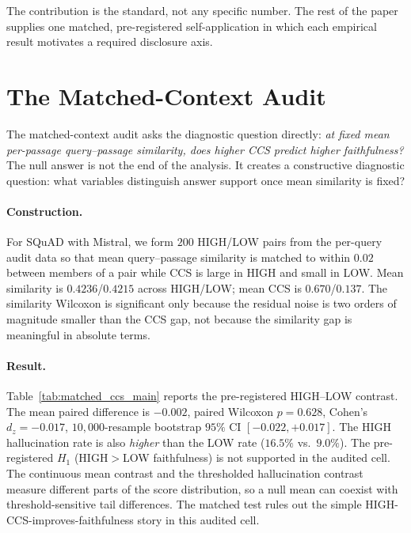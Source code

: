The contribution is the standard, not any specific number. The rest of
the paper supplies one matched, pre-registered self-application in
which each empirical result motivates a required disclosure axis.

\section{The Matched-Context Audit}
\label{sec:matched_ccs}

The matched-context audit asks the diagnostic question directly:
\emph{at fixed mean per-passage query--passage similarity, does higher
CCS predict higher faithfulness?} The null answer is not the end of the
analysis. It creates a constructive diagnostic question: what variables
distinguish answer support once mean similarity is fixed?

\paragraph{Construction.} For SQuAD with Mistral, we form $200$
HIGH/LOW pairs from the per-query audit data so that mean
query--passage similarity is matched to within $0.02$ between members
of a pair while CCS is large in HIGH and small in LOW. Mean similarity
is $0.4236$/$0.4215$ across HIGH/LOW; mean CCS is $0.670$/$0.137$. The
similarity Wilcoxon is significant only because the residual noise is
two orders of magnitude smaller than the CCS gap, not because the
similarity gap is meaningful in absolute terms.

\paragraph{Result.} Table~\ref{tab:matched_ccs_main} reports the
pre-registered HIGH--LOW contrast. The mean paired difference is
$-0.002$, paired Wilcoxon $p = 0.628$, Cohen's $d_z = -0.017$,
$10{,}000$-resample bootstrap $95\%$ CI $[-0.022, +0.017]$. The HIGH
hallucination rate is also \emph{higher} than the LOW rate
($16.5\%$ vs.\ $9.0\%$). The pre-registered $H_1$
(HIGH$>$LOW faithfulness) is not supported in the audited cell. The
continuous mean contrast and the thresholded hallucination contrast
measure different parts of the score distribution, so a null mean can
coexist with threshold-sensitive tail differences. The matched test
rules out the simple HIGH-CCS-improves-faithfulness story in this
audited cell.

